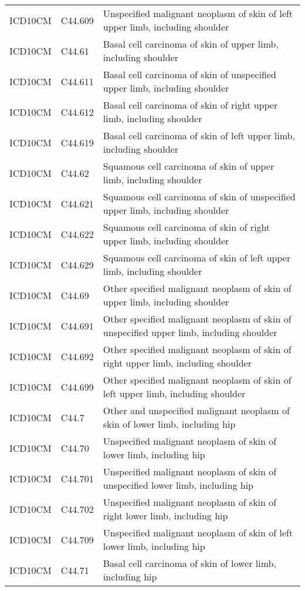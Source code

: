 \begin{table}[ht]
\begin{tabular}{lll}
  ICD10CM & C44.609 & Unspecified malignant neoplasm of skin of left upper limb, including shoulder \\ 
  ICD10CM & C44.61 & Basal cell carcinoma of skin of upper limb, including shoulder \\ 
  ICD10CM & C44.611 & Basal cell carcinoma of skin of unspecified upper limb, including shoulder \\ 
  ICD10CM & C44.612 & Basal cell carcinoma of skin of right upper limb, including shoulder \\ 
  ICD10CM & C44.619 & Basal cell carcinoma of skin of left upper limb, including shoulder \\ 
  ICD10CM & C44.62 & Squamous cell carcinoma of skin of upper limb, including shoulder \\ 
  ICD10CM & C44.621 & Squamous cell carcinoma of skin of unspecified upper limb, including shoulder \\ 
  ICD10CM & C44.622 & Squamous cell carcinoma of skin of right upper limb, including shoulder \\ 
  ICD10CM & C44.629 & Squamous cell carcinoma of skin of left upper limb, including shoulder \\ 
  ICD10CM & C44.69 & Other specified malignant neoplasm of skin of upper limb, including shoulder \\ 
  ICD10CM & C44.691 & Other specified malignant neoplasm of skin of unspecified upper limb, including shoulder \\ 
  ICD10CM & C44.692 & Other specified malignant neoplasm of skin of right upper limb, including shoulder \\ 
  ICD10CM & C44.699 & Other specified malignant neoplasm of skin of left upper limb, including shoulder \\ 
  ICD10CM & C44.7 & Other and unspecified malignant neoplasm of skin of lower limb, including hip \\ 
  ICD10CM & C44.70 & Unspecified malignant neoplasm of skin of lower limb, including hip \\ 
  ICD10CM & C44.701 & Unspecified malignant neoplasm of skin of unspecified lower limb, including hip \\ 
  ICD10CM & C44.702 & Unspecified malignant neoplasm of skin of right lower limb, including hip \\ 
  ICD10CM & C44.709 & Unspecified malignant neoplasm of skin of left lower limb, including hip \\ 
  ICD10CM & C44.71 & Basal cell carcinoma of skin of lower limb, including hip \\ 

\end{tabular}
\end{table}
